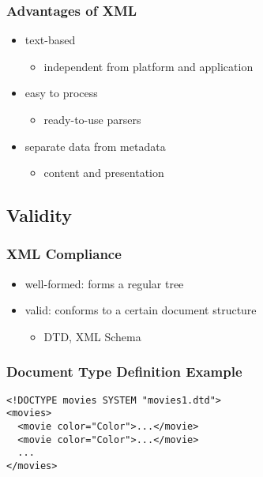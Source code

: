 \documentclass[dvipsnames]{beamer}
\theoremstyle{plain}
\begin{document}
\begin{frame}
  \frametitle{Advantages of XML}

  \begin{itemize}
    \item text-based
    \begin{itemize}
      \item independent from platform and application
    \end{itemize}

    \pause
    \item easy to process
    \begin{itemize}
      \item ready-to-use parsers
    \end{itemize}

    \pause
    \item separate data from metadata
    \begin{itemize}
      \item content and presentation
    \end{itemize}
  \end{itemize}
\end{frame}

\subsection{Validity}

\begin{frame}
  \frametitle{XML Compliance}

  \begin{itemize}
    \item \alert{well-formed}: forms a regular tree

    \medskip
    \item \alert{valid}: conforms to a certain document structure
    \begin{itemize}
      \item DTD, XML Schema
    \end{itemize}
  \end{itemize}
\end{frame}

\begin{frame}[fragile]
  \frametitle{Document Type Definition Example}

  \begin{example}
    \begin{lstlisting}
<!DOCTYPE movies SYSTEM "movies1.dtd">
<movies>
  <movie color="Color">...</movie>
  <movie color="Color">...</movie>
  ...
</movies>
    \end{lstlisting}
  \end{example}
\end{frame}
\end{document}
